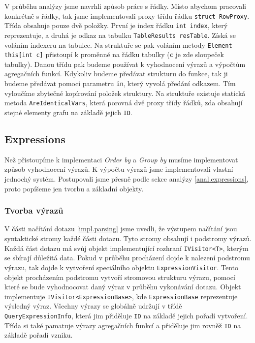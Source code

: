V průběhu analýzy jsme navrhli způsob práce s řádky. 
Místo abychom pracovali konkrétně s řádky, tak jsme implementovali proxy třídu řádku \texttt{struct RowProxy}.
Třída obsahuje pouze dvě položky. 
První je index řádku \texttt{int index}, který reprezentuje, a druhá je odkaz na tabulku \texttt{TableResults resTable}.
Získá se voláním indexeru na tabulce.
Na struktuře se pak voláním metody \texttt{Element this[int c]} přistoupí k proměnné na řádku tabulky (\texttt{c} je zde sloupeček tabulky).
Danou třídu pak budeme používat k vyhodnocení výrazů a výpočtům agregačních funkcí.
Kdykoliv budeme předávat strukturu do funkce, tak ji budeme předávat pomocí parametru \texttt{in}, který vyvolá předání odkazem.
Tím vyloučíme zbytečné kopírování položek struktury.
Na struktuře existuje statická metoda \texttt{AreIdenticalVars}, která porovná dvě proxy třídy řádků, zda obsahují stejné elementy grafu na základě jejich \texttt{ID}.

\subsection{Expressions}

Než přistoupíme k implementaci \textit{Order by} a \textit{Group by} musíme implementovat způsob vyhodnocení výrazů.
K výpočtu výrazů jsme implementovali vlastní jednochý systém.
Postupovali jsme přesně podle sekce analýzy \ref{anal.expressions}, proto popíšeme jen tvorbu a základní objekty.

\subsubsection{Tvorba výrazů}

V části načítání dotazu \ref{impl.parsing} jsme uvedli, že výstupem načítání jsou syntaktické stromy každé části dotazu.
Tyto stromy obsahují i podstromy výrazů.
Každá část dotazu má svůj objekt implementující rozhraní \texttt{IVisitor<T>}, kterým se sbírají důležitá data.
Pokud v průběhu procházení dojde k nalezení podstromu výrazu, tak dojde k vytvoření speciálního objektu \texttt{ExpressionVisitor}.
Tento objekt procházením podstromu vytvoří stromovou strukturu výrazu, pomocí které se bude vyhodnocovat daný výraz v průběhu vykonávání dotazu.
Objekt implementuje \texttt{IVisitor<ExpressionBase>}, kde \texttt{ExpressionBase} reprezentuje výsledný výraz.
Všechny výrazy se globálně udržují v třídě \texttt{QueryExpressionInfo}, která jim přiděluje \texttt{ID} na základě jejich pořadí vytvoření.
Třída si také pamatuje výrazy agregačních funkcí a přiděluje jim rovněž \texttt{ID} na základě pořadí vzniku.

